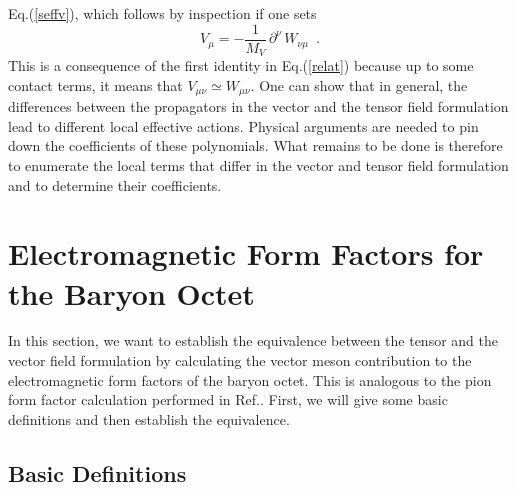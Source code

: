 Eq.(\ref{seffv}), which follows by inspection if one sets
\begin{equation}
V_\mu = -\frac{1}{M_V} \, \partial^\nu \, W_{\nu \mu}  \, \, \, .
\label{formeq}
\end{equation}
This is a consequence of the first identity in Eq.(\ref{relat}) because up
to some contact terms, it means that $V_{\mu \nu} \simeq W_{\mu \nu}$. One
can show that in
general, the differences between the propagators in the vector and the
tensor field formulation lead to different local effective
actions. Physical arguments are needed to pin down the coefficients of
these polynomials. What remains to be done is therefore to enumerate the
local terms that differ in the vector and tensor field formulation and to
determine their coefficients.



\section{Electromagnetic Form Factors for the Baryon Octet}

In this section, we want to establish the equivalence between the
tensor and the vector field formulation by calculating the
vector meson contribution to the electromagnetic form factors of the
baryon octet. This is analogous to the pion form factor calculation
performed in Ref.\cite{reso1}. First, we will give some basic definitions
and then establish the equivalence.

\subsection{Basic Definitions}

